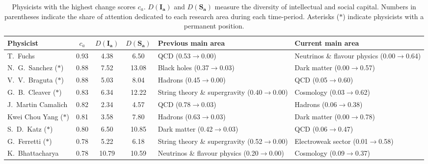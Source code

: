\begin{table}[H]
\centering
\caption{Physicists with the highest change scores $c_a$. $D(\bm{I_a})$ and $D(\bm{S_a})$ measure the diversity of intellectual and social capital. Numbers in parentheses indicate the share of attention dedicated to each research area during each time-period. Asterisks ($\ast$) indicate physicists with a permanent position.}
\label{table:top_change}
\begin{tabular}{p{}|c|c|c|b{}|b{}}
\toprule
               Physicist & $c_a$ & $D(\bm{I_a})$ & $D(\bm{S_a})$ &                            Previous main area &                               Current main area \\
\midrule
                T.~Fuchs &  0.93 &          4.38 &          6.50 &                           QCD (0.53$\to$0.00) & Neutrinos \& flavour physics (0.00$\to$0.64)\\ \hline
  N.~G.~Sanchez ($\ast$) &  0.88 &          7.52 &         13.08 &                   Black holes (0.37$\to$0.03) &                  Dark matter (0.00$\to$0.57)\\ \hline
  V.~V.~Braguta ($\ast$) &  0.88 &          5.03 &          8.04 &                       Hadrons (0.45$\to$0.00) &                          QCD (0.05$\to$0.60)\\ \hline
  G.~B.~Cleaver ($\ast$) &  0.83 &          6.34 &         12.22 & String theory \& supergravity (0.40$\to$0.00) &                    Cosmology (0.03$\to$0.62)\\ \hline
      J.~Martin Camalich &  0.82 &          2.34 &          4.57 &                           QCD (0.78$\to$0.03) &                      Hadrons (0.06$\to$0.38)\\ \hline
 Kwei Chou Yang ($\ast$) &  0.81 &          3.58 &          7.80 &                       Hadrons (0.63$\to$0.03) &                  Dark matter (0.00$\to$0.78)\\ \hline
     S.~D.~Katz ($\ast$) &  0.80 &          6.50 &         10.85 &                   Dark matter (0.42$\to$0.03) &                          QCD (0.06$\to$0.47)\\ \hline
    G.~Ferretti ($\ast$) &  0.78 &          5.22 &          6.18 & String theory \& supergravity (0.52$\to$0.00) &           Electroweak sector (0.01$\to$0.58)\\ \hline
         K.~Bhattacharya &  0.78 &         10.79 &         10.59 &  Neutrinos \& flavour physics (0.20$\to$0.00) &                    Cosmology (0.09$\to$0.37)\\ \hline

\end{tabular}
\end{table}

